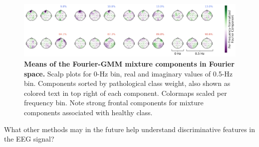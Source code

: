 \begin{figure}[htb]
    \myfloatalign
    \includegraphics[width=1\linewidth]{images/low-freq-gmm-prototypes-scaled-per-freq-with-class-color-and-bar.png}
    \caption[Fourier-GMM means in Fourier space]{
\textbf{Means of the Fourier-GMM mixture components in Fourier space.}
Scalp plots for 0-Hz bin, real and imaginary values of 0.5-Hz bin.
Components sorted by pathological class weight, also shown as colored
text in top right of each component. Colormaps scaled per frequency bin.
Note strong frontal components for mixture components associated with
healthy class.
}
\label{fourier-gmm-low-freq-fig}
\end{figure}

\begin{openbox}
\item What other methods may in the future help understand discriminative features in the EEG signal?
\end{openbox}
